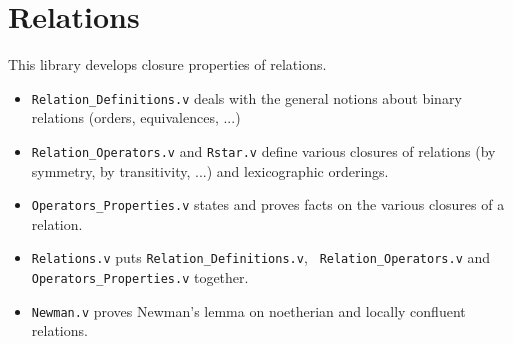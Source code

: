 \section{Relations}\label{Relations}

This library develops closure properties of relations.

\begin{itemize}
\item {\tt Relation\_Definitions.v} deals with the general notions
  about binary relations (orders, equivalences, ...)

\item {\tt Relation\_Operators.v} and {\tt Rstar.v} define various
  closures of relations (by symmetry, by transitivity, ...) and
  lexicographic orderings.

\item {\tt Operators\_Properties.v} states and proves facts on the
  various closures of a relation.

\item {\tt Relations.v} puts {\tt Relation\_Definitions.v}, {\tt
    Relation\_Operators.v} and \\
    {\tt Operators\_Properties.v} together.

\item {\tt Newman.v} proves Newman's lemma on noetherian and locally
  confluent relations.

\end{itemize}
